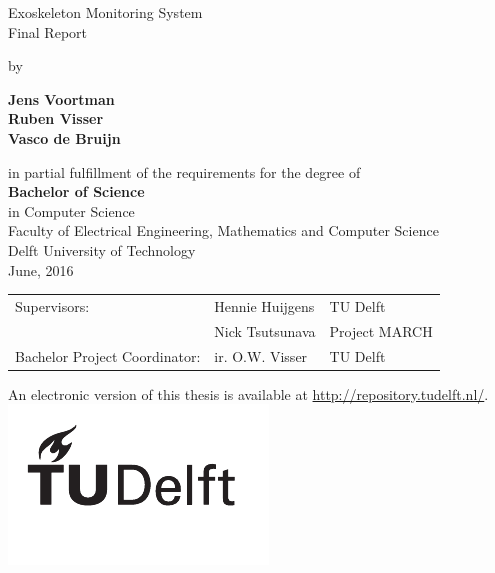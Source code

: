 \begin{titlepage}
\begin{center}

{\makeatletter
\Huge Exoskeleton Monitoring System
\makeatother}\\[0.2cm]

{\makeatletter
\LARGE Final Report
\makeatother}

\bigskip
\bigskip

by

\bigskip
\bigskip

{\makeatletter \bfseries
Jens Voortman\\
Ruben Visser\\
Vasco de Bruijn
\makeatother}

\vfill
in partial fulfillment of the requirements for the degree of\\
\bigskip
{\bfseries \large Bachelor of Science}\\
{\large in Computer Science}\\
\bigskip
Faculty of Electrical Engineering, Mathematics and Computer Science\\
Delft University of Technology\\
{\large June, 2016}\\



\vfill

\begin{tabular}{l l l}
    Supervisors: & Hennie Huijgens & TU Delft \\
    & Nick Tsutsunava & Project MARCH \\
    Bachelor Project Coordinator: & ir. O.W. Visser & TU Delft\\
 \end{tabular}

\bigskip
\bigskip

\bigskip
\bigskip

An electronic version of this thesis is available at \url{http://repository.tudelft.nl/}.\\[0.5cm]
\includegraphics{logo/logo_black}
\end{center}
\end{titlepage}